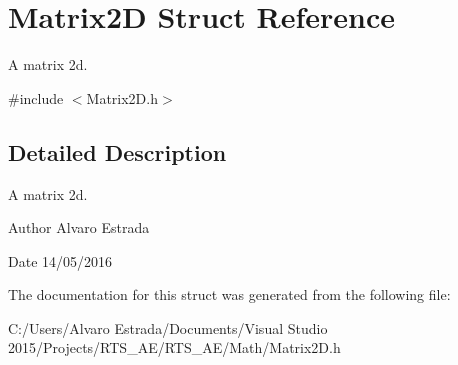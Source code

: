\hypertarget{struct_matrix2_d}{}\section{Matrix2D Struct Reference}
\label{struct_matrix2_d}


A matrix 2d.  




{\ttfamily \#include $<$Matrix2\+D.\+h$>$}



\subsection{Detailed Description}
A matrix 2d. 

\begin{DoxyAuthor}{Author}
Alvaro Estrada 
\end{DoxyAuthor}
\begin{DoxyDate}{Date}
14/05/2016 
\end{DoxyDate}


The documentation for this struct was generated from the following file\+:\begin{DoxyCompactItemize}
\item 
C\+:/\+Users/\+Alvaro Estrada/\+Documents/\+Visual Studio 2015/\+Projects/\+R\+T\+S\+\_\+\+A\+E/\+R\+T\+S\+\_\+\+A\+E/\+Math/Matrix2\+D.\+h\end{DoxyCompactItemize}
